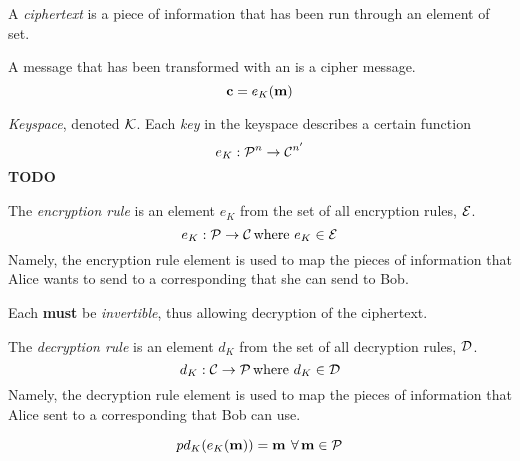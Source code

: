\begin{definition}[Ciphertext]\label{def:Ciphertext}
  A \emph{ciphertext} is a piece of  information that has been run through an element of  set.

  A message that has been transformed with an  is a cipher message.
  \begin{equation}\label{eq:Ciphertext}
    \operatorname{\mathbf{c}} = e_{K} (\operatorname{\mathbf{m}})
  \end{equation}
\end{definition}

\begin{definition}[Keyspace]\label{def:Keyspace}
  \emph{Keyspace}, denoted $\operatorname{\mathcal{K}}$.
  Each \emph{key} in the keyspace describes a certain function
  \begin{equation}\label{eq:Keyspace}
    e_{K} : \operatorname{\mathcal{P}}^{n} \rightarrow \operatorname{\mathcal{C}}^{n'}
  \end{equation}
  \textbf{TODO}
\end{definition}

\begin{definition}\label{def:Encryption_Rule}
  The \emph{encryption rule} is an element $e_{K}$ from the set of all encryption rules, $\operatorname{\mathcal{E}}$.
  \begin{equation}\label{eq:Encryption_Rule}
    e_{K} : \operatorname{\mathcal{P}} \rightarrow \operatorname{\mathcal{C}} \text{where } e_{K} \in \operatorname{\mathcal{E}}
  \end{equation}
  Namely, the encryption rule element is used to map the  pieces of information that Alice wants to send to a corresponding  that she can send to Bob.

  \begin{remark}[Invertible]\label{rmk:Encryption_Rule_Invertible}
    Each  \textbf{must} be \emph{invertible}, thus allowing decryption of the ciphertext.
  \end{remark}
\end{definition}

\begin{definition}\label{def:Decryption_Rule}
  The \emph{decryption rule} is an element $d_{K}$ from the set of all decryption rules, $\operatorname{\mathcal{D}}$.
  \begin{equation}\label{eq:Decryption_Rule}
    d_{K} : \operatorname{\mathcal{C}} \rightarrow \operatorname{\mathcal{P}} \text{where } d_{K} \in \operatorname{\mathcal{D}}
  \end{equation}
  Namely, the decryption rule element is used to map the  pieces of information that Alice sent to a corresponding  that Bob can use.

  \begin{remark}
    \begin{equation}\label{eq:Decrypt_Encryption}
p      d_{K}(e_{K}(\operatorname{\mathbf{m}})) = \operatorname{\mathbf{m}} \: \forall \operatorname{\mathbf{m}} \in \operatorname{\mathcal{P}}
    \end{equation}
  \end{remark}
\end{definition}

